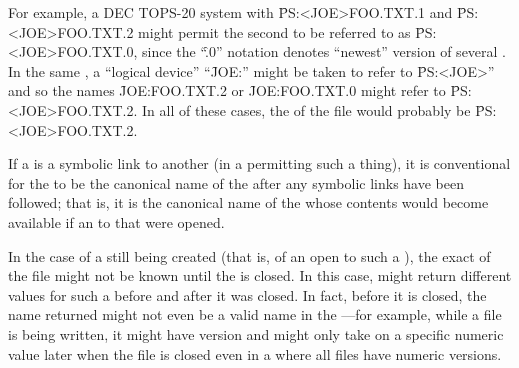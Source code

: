 For example, a DEC TOPS-20 system with  \f{PS:<JOE>FOO.TXT.1} 
and \f{PS:<JOE>FOO.TXT.2} might permit the second  to be referred
to as \f{PS:<JOE>FOO.TXT.0}, since the ``\f{.0}'' notation denotes ``newest''
version of several .
In the same , a ``logical device'' ``\f{JOE:}'' might be 
taken to refer to \f{PS:<JOE>}'' and so the names \f{JOE:FOO.TXT.2} or
\f{JOE:FOO.TXT.0} might refer to \f{PS:<JOE>FOO.TXT.2}.
In all of these cases, the  of the file would probably be
\f{PS:<JOE>FOO.TXT.2}.

If a  is a symbolic link to another  (in a 
permitting such a thing), it is conventional for the  to be
the canonical name of the  after any symbolic links have been followed;
that is, it is the canonical name of the  whose contents would
become available if an   to that  were 
opened.

In the case of a  still being created (that is, of an 
 open to such a ), the exact  of the file
might not be known until the  is closed.  In this case, 
 might return different values for such a 
before and after it was closed.  In fact, before it is closed, the name returned
might not even be a valid name in the ---for example, while a
file is being written, it might have version  and might only take on 
a specific numeric value later when the file is closed even in a 
where all files have numeric versions.

\endsubsubsection%

\endsubsection%
